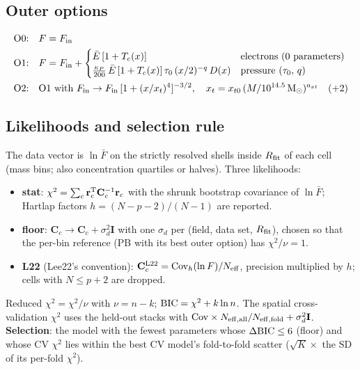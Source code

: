 \documentclass[10pt,a4paper]{article}
\newcommand{\Rfit}{R_{\rm fit}}
\begin{document}
\subsection{Outer options}
\begin{align}
\text{O0:}\quad&F=F_{\rm in}\\
\text{O1:}\quad&F=F_{\rm in}+\begin{cases}\bar E\,[1+T_c(x)]&\text{electrons (0 parameters)}\\
\frac{\kappa_P}{200}\,\bar E\,[1+T_c(x)]\,\tau_0\,(x/2)^{-q}\,D(x)&\text{pressure }(\tau_0,\,q)\end{cases}\\
\text{O2:}\quad&\text{O1 with }F_{\rm in}\to F_{\rm in}\,[1+(x/x_t)^4]^{-3/2},\quad x_t=x_{t0}\,(M/10^{14.5}\,{\rm M}_\odot)^{a_{xt}}\quad(+2)
\end{align}

\subsection{Likelihoods and selection rule}
The data vector is $\ln\bar F$ on the strictly resolved shells inside $\Rfit$ of each cell (mass bins; also concentration
quartiles or halves). Three likelihoods:
\begin{itemize}
\item \textbf{stat}: $\chi^2=\sum_c\mathbf r_c^{\rm T}\mathbf C_c^{-1}\mathbf r_c$ with the shrunk bootstrap covariance of
  $\ln\bar F$; Hartlap factors $h=(N-p-2)/(N-1)$ are reported.
\item \textbf{floor}: $\mathbf C_c\to\mathbf C_c+\sigma_d^2\mathbf I$ with one $\sigma_d$ per (field, data set, $\Rfit$),
  chosen so that the per-bin reference (PB with its best outer option) has $\chi^2/\nu=1$.
\item \textbf{L22} (Lee22's convention): $\mathbf C_c^{\rm L22}={\rm Cov}_h(\ln F)/N_{\rm eff}$, precision multiplied by $h$;
  cells with $N\le p+2$ are dropped.
\end{itemize}
Reduced $\chi^2=\chi^2/\nu$ with $\nu=n-k$; ${\rm BIC}=\chi^2+k\ln n$. The spatial cross-validation $\chi^2$ uses the
held-out stacks with ${\rm Cov}\times N_{\rm eff,all}/N_{\rm eff,fold}+\sigma_d^2\mathbf I$. \textbf{Selection}: the model
with the fewest parameters whose $\Delta{\rm BIC}\le6$ (floor) and whose CV $\chi^2$ lies within the best CV model's
fold-to-fold scatter ($\sqrt K\times$ the SD of its per-fold $\chi^2$).

\end{document}
